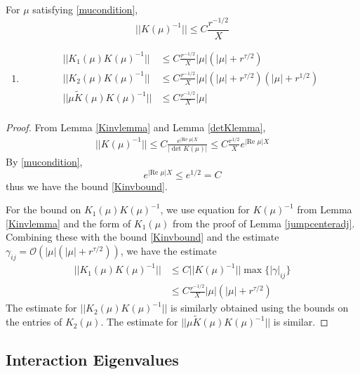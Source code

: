 \documentclass[thesis.tex]{subfiles}
\begin{document}
\begin{lemma}\label{Kinvboundslemma}
For $\mu$ satisfying \cref{mucondition},
\begin{equation}\label{Kinvbound}
||K(\mu)^{-1}|| \leq C \frac{r^{-1/2}}{X}
\end{equation}
\begin{enumerate}
\item 
\begin{align}
||K_1(\mu)K(\mu)^{-1}|| &\leq C \frac{r^{-1/2}}{X} |\mu|(|\mu| + r^{\tau/2}) \label{K1Kinvbound} \\
||K_2(\mu)K(\mu)^{-1}|| &\leq C \frac{r^{-1/2}}{X} |\mu|(|\mu| + r^{\tau/2})(|\mu| + r^{1/2}) \label{K2Kinvbound} \\
||\mu \tilde{K}(\mu)K(\mu)^{-1}|| &\leq C \frac{r^{-1/2}}{X} |\mu| \label{K2Kinvbound} \\
\end{align}
\end{enumerate}
\begin{proof}
From Lemma \ref{Kinvlemma} and Lemma \ref{detKlemma},
\begin{align*}
||K(\mu)^{-1}|| \leq C \frac{e^{|\text{Re }\mu|X }}{| \det K(\mu) |} \leq C \frac{r^{1/2}}{X} e^{|\text{Re }\mu|X }
\end{align*}
By \cref{mucondition},
\[
e^{|\text{Re }\mu|X } \leq e^{1/2} = C
\]
thus we have the bound \cref{Kinvbound}.

For the bound on $K_1(\mu)K(\mu)^{-1}$, we use equation for $K(\mu)^{-1}$ from Lemma \ref{Kinvlemma} and the form of $K_1(\mu)$ from the proof of Lemma \ref{jumpcenteradj}. Combining these with the bound \cref{Kinvbound} and the estimate $\gamma_{ij} = \mathcal{O}(|\mu|(|\mu| + r^{\tau/2}))$, we have the estimate
\begin{align*}
||K_1(\mu)K(\mu)^{-1}|| &\leq 
C ||K(\mu)^{-1}|| \max \{|\gamma|_{ij}\} \\
&\leq C \frac{r^{-1/2}}{X} |\mu|(|\mu| + r^{\tau/2})
\end{align*}
The estimate for $||K_2(\mu)K(\mu)^{-1}||$ is similarly obtained using the bounds on the entries of $K_2(\mu)$. The estimate for $||\mu \tilde{K}(\mu)K(\mu)^{-1}||$ is similar.
\end{proof}
\end{lemma}

\subsection{Interaction Eigenvalues}
\end{document}
